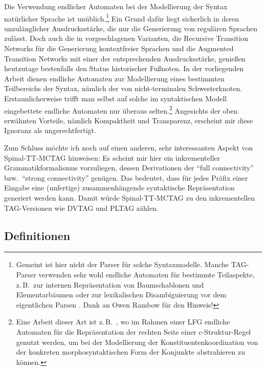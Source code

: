 Die Verwendung endlicher Automaten bei der Modellierung der Syntax natürlicher Sprache ist unüblich.\footnote{Gemeint ist hier nicht der Parser für solche Syntaxmodelle. Manche TAG-Parser verwenden sehr wohl endliche Automaten für bestimmte Teilaspekte, z.\,B.\ zur internen Repräsentation von Baumschablonen und Elementarbäumen \citep{Nasr:Rambow:04} oder zur lexikalischen Disambiguierung vor dem eigentlichen Parsen \citep{Gardent:etal:14}. Dank an Owen Rambow für den Hinweis!} Ein Grund dafür liegt sicherlich in deren unzulänglicher Ausdrucksstärke, die nur die Generierung von regulären Sprachen zulässt. Doch auch die in \cite{Woods:70} vorgeschlagenen Varianten, die Recursive Transition Networks für die Generierung kontextfreier Sprachen und die Augmented Transition Networks mit einer der  entsprechenden Ausdrucksstärke, genie\ss en heutzutage bestenfalls den Status historischer Fu\ss noten. In der vorliegenden Arbeit dienen endliche Automaten zur Modellierung eines bestimmten Teilbereichs der Syntax, nämlich der  von nicht-terminalen Schwesterknoten. Erstaunlicherweise trifft man selbst auf solche im syntaktischen Modell eingebettete endliche Automaten nur überaus selten.\footnote{Eine Arbeit dieser Art ist z.\,B.\ \cite{Maxwell:Manning:96}, wo im Rahmen einer LFG endliche Automaten für die Repräsentation der rechten Seite einer c-Struktur-Regel genutzt werden, um bei der Modellierung der Konstituentenkoordination von der konkreten morphosyntaktischen Form der Konjunkte abstrahieren zu können.} Angesichts der oben erwähnten Vorteile, nämlich Kompaktheit und Transparenz, erscheint mir diese Ignoranz als ungerechtfertigt.

Zum Schluss möchte ich noch auf einen anderen, sehr interessanten Aspekt von Spinal-TT-MCTAG hinweisen: Es scheint mir hier ein inkrementeller Grammatikformalismus vorzuliegen, dessen Derivationen der "`full connectivity"' \citep{Sturt:Lombardo:05} bzw.\ "`strong connectivity"' \citep{Stabler:94} genügen. Das bedeutet, dass für jedes Präfix einer Eingabe eine (unfertige) zusammenhängende syntaktische Repräsentation generiert werden kann. Damit würde Spinal-TT-MCTAG zu den inkrementellen TAG-Versionen wie DVTAG \citep{Mazzei:etal:07} und PLTAG \citep{Demberg:Keller:08, Demberg:10} zählen. 


\subsection{Definitionen}

